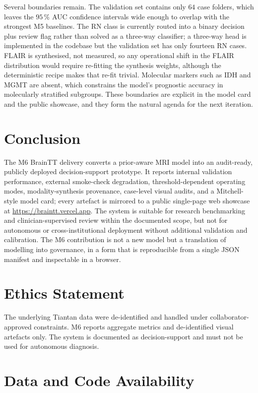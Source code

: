 \documentclass[11pt,a4paper]{article}
\begin{document}
Several boundaries remain. The validation set contains only $64$ case folders, which leaves the $95\,\%$ AUC confidence intervals wide enough to overlap with the strongest M5 baselines. The RN class is currently routed into a binary decision plus review flag rather than solved as a three-way classifier; a three-way head is implemented in the codebase but the validation set has only fourteen RN cases. FLAIR is synthesised, not measured, so any operational shift in the FLAIR distribution would require re-fitting the synthesis weights, although the deterministic recipe makes that re-fit trivial. Molecular markers such as IDH and MGMT are absent, which constrains the model's prognostic accuracy in molecularly stratified subgroups. These boundaries are explicit in the model card and the public showcase, and they form the natural agenda for the next iteration.

\section{Conclusion}

The M6 BrainTT delivery converts a prior-aware MRI model into an audit-ready, publicly deployed decision-support prototype. It reports internal validation performance, external smoke-check degradation, threshold-dependent operating modes, modality-synthesis provenance, case-level visual audits, and a Mitchell-style model card; every artefact is mirrored to a public single-page web showcase at \url{https://braintt.vercel.app}. The system is suitable for research benchmarking and clinician-supervised review within the documented scope, but not for autonomous or cross-institutional deployment without additional validation and calibration. The M6 contribution is not a new model but a translation of modelling into governance, in a form that is reproducible from a single JSON manifest and inspectable in a browser.

\section*{Ethics Statement}

The underlying Tiantan data were de-identified and handled under collaborator-approved constraints. M6 reports aggregate metrics and de-identified visual artefacts only. The system is documented as decision-support and must not be used for autonomous diagnosis.

\section*{Data and Code Availability}
\end{document}
